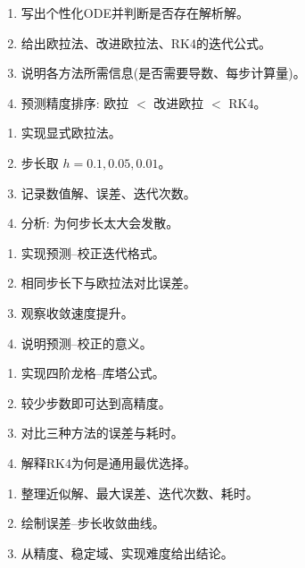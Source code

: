 \documentclass[zihao=-4,a4paper]{ctexart}
\begin{document}
\begin{enumerate}
    \item 写出个性化ODE并判断是否存在解析解。
    \item 给出欧拉法、改进欧拉法、RK4的迭代公式。
    \item 说明各方法所需信息(是否需要导数、每步计算量)。
    \item 预测精度排序: 欧拉 $<$ 改进欧拉 $<$ RK4。
\end{enumerate}


\begin{enumerate}
    \item 实现显式欧拉法。
    \item 步长取 $h=0.1,0.05,0.01$。
    \item 记录数值解、误差、迭代次数。
    \item 分析: 为何步长太大会发散。
\end{enumerate}

\begin{enumerate}
    \item 实现预测–校正迭代格式。
    \item 相同步长下与欧拉法对比误差。
    \item 观察收敛速度提升。
    \item 说明预测–校正的意义。
\end{enumerate}

\begin{enumerate}
    \item 实现四阶龙格–库塔公式。
    \item 较少步数即可达到高精度。
    \item 对比三种方法的误差与耗时。
    \item 解释RK4为何是通用最优选择。
\end{enumerate}

\begin{enumerate}
    \item 整理近似解、最大误差、迭代次数、耗时。
    \item 绘制误差–步长收敛曲线。
    \item 从精度、稳定域、实现难度给出结论。
\end{enumerate}
\end{document}
